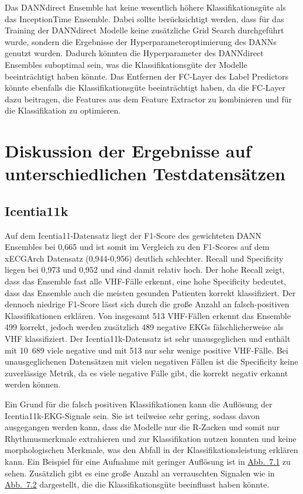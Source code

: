 Das \gls{DANN}direct Ensemble hat keine wesentlich höhere Klassifikationsgüte als das InceptionTime Ensemble. Dabei sollte berücksichtigt werden, dass für das Training der \gls{DANN}direct Modelle keine zusätzliche Grid Search durchgeführt wurde, sondern die Ergebnisse der Hyperparameteroptimierung des \gls{DANN}s genutzt wurden. Dadurch könnten die Hyperparameter des \gls{DANN}direct Ensembles suboptimal sein, was die Klassifikationsgüte der Modelle beeinträchtigt haben könnte. Das Entfernen der \gls{FC}-Layer des Label Predictors könnte ebenfalls die Klassifikationsgüte beeinträchtigt haben, da die \gls{FC}-Layer dazu beitragen, die Features aus dem Feature Extractor zu kombinieren und für die Klassifikation zu optimieren. 


\section{Diskussion der Ergebnisse auf unterschiedlichen Testdatensätzen}\label{sec:disktest}

\subsection*{Icentia11k}

Auf dem Icentia11-Datensatz liegt der F1-Score des gewichteten \gls{DANN} Ensembles bei 0,665 und ist somit im Vergleich zu den F1-Scores auf dem xECGArch Datensatz (0,944-0,956) deutlich schlechter. Recall und Specificity liegen bei 0,973 und 0,952 und sind damit relativ hoch. Der hohe Recall zeigt, dass das Ensemble fast alle \gls{VHF}-Fälle erkennt, eine hohe Specificity bedeutet, dass das Ensemble auch die meisten gesunden Patienten korrekt klassifiziert. Der dennoch niedrige F1-Score lässt sich durch die große Anzahl an falsch-positiven Klassifikationen erklären. Von insgesamt 513 \gls{VHF}-Fällen erkennt das Ensemble 499 korrekt, jedoch werden zusätzlich 489 negative \gls{EKG}s fälschlicherweise als \gls{VHF} klassifiziert. Der Icentia11k-Datensatz ist sehr unausgeglichen und enthält mit 10~689 viele negative und mit 513 nur sehr wenige positive \gls{VHF}-Fälle. Bei unausgeglichenen Datensätzen mit vielen negativen Fällen ist die Specificity keine zuverlässige Metrik, da es viele negative Fälle gibt, die korrekt negativ erkannt werden können.   

Ein Grund für die falsch positiven Klassifikationen kann die Auflösung der Icentia11k-\gls{EKG}-Signale sein. Sie ist teilweise sehr gering, sodass davon ausgegangen werden kann, dass die Modelle nur die R-Zacken und somit nur Rhythmusmerkmale extrahieren und zur Klassifikation nutzen konnten und keine morphologischen Merkmale, was den Abfall in der Klassifikationsleistung erklären kann. Ein Beispiel für eine Aufnahme mit geringer Auflösung ist in  \hyperref[fig:icentia_plot]{Abb.~7.1} zu sehen. Zusätzlich gibt es eine große Anzahl an verrauschten Signalen wie in \hyperref[fig:icentia_plot]{Abb.~7.2} dargestellt, die die Klassifikationsgüte beeinflusst haben könnte. 

